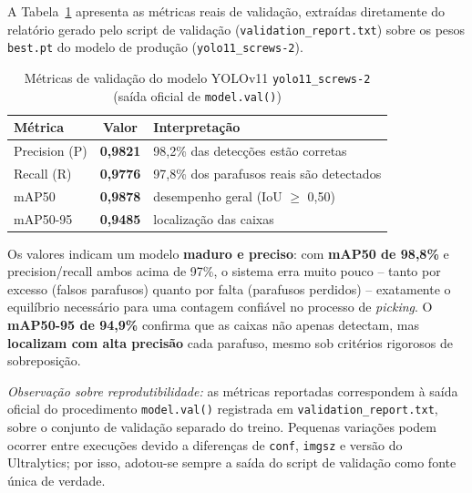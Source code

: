 \documentclass[12pt,a4paper]{article}
\begin{document}
A Tabela~\ref{tab:metricas-reais} apresenta as m\'etricas reais de valida\c{c}\~ao,
extra\'idas diretamente do relat\'orio gerado pelo script de valida\c{c}\~ao
(\texttt{validation\_report.txt}) sobre os pesos \texttt{best.pt} do modelo de produ\c{c}\~ao
(\texttt{yolo11\_screws-2}).

\begin{table}[H]
  \centering
  \caption{M\'etricas de valida\c{c}\~ao do modelo YOLOv11 \texttt{yolo11\_screws-2}
           (sa\'ida oficial de \texttt{model.val()})}
  \label{tab:metricas-reais}
  \renewcommand{\arraystretch}{1.3}
  \begin{tabular}{lcl}
    \toprule
    \textbf{M\'etrica} & \textbf{Valor} & \textbf{Interpreta\c{c}\~ao} \\
    \midrule
    Precision (P) & \textbf{0,9821} & 98,2\% das detec\c{c}\~oes est\~ao corretas \\
    Recall (R)    & \textbf{0,9776} & 97,8\% dos parafusos reais s\~ao detectados \\
    mAP50         & \textbf{0,9878} & desempenho geral (IoU $\geq$ 0,50) \\
    mAP50-95      & \textbf{0,9485} & localiza\c{c}\~ao das caixas \\
    \bottomrule
  \end{tabular}
\end{table}

\begin{tcolorbox}[vantagem={Leitura dos Resultados}]
Os valores indicam um modelo \textbf{maduro e preciso}: com
\textbf{mAP50 de 98,8\%} e precision/recall ambos acima de 97\%, o sistema erra muito
pouco -- tanto por excesso (falsos parafusos) quanto por falta (parafusos perdidos) --
exatamente o equil\'ibrio necess\'ario para uma contagem confi\'avel no processo de
\emph{picking}. O \textbf{mAP50-95 de 94,9\%} confirma que as caixas n\~ao apenas
detectam, mas \textbf{localizam com alta precis\~ao} cada parafuso, mesmo sob crit\'erios
rigorosos de sobreposi\c{c}\~ao.
\end{tcolorbox}

\medskip
\textit{Observa\c{c}\~ao sobre reprodutibilidade:} as m\'etricas reportadas correspondem
\`a sa\'ida oficial do procedimento \texttt{model.val()} registrada em
\texttt{validation\_report.txt}, sobre o conjunto de valida\c{c}\~ao separado do treino.
Pequenas varia\c{c}\~oes podem ocorrer entre execu\c{c}\~oes devido a diferen\c{c}as de
\texttt{conf}, \texttt{imgsz} e vers\~ao do Ultralytics; por isso, adotou-se sempre a
sa\'ida do script de valida\c{c}\~ao como fonte \'unica de verdade.
\end{document}
